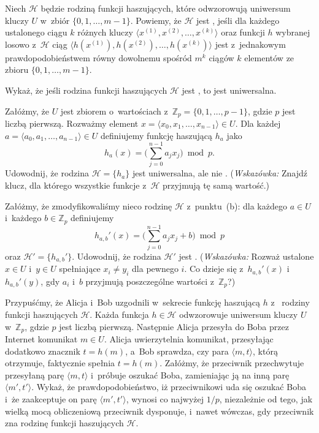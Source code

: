 \noindent Niech $\mathcal{H}$ będzie rodziną funkcji haszujących, które odwzorowują uniwersum kluczy $U$ w~zbiór $\{0,1,\dots,m-1\}$.
Powiemy, że $\mathcal{H}$ jest \textbf{}, jeśli dla każdego ustalonego ciągu $k$ różnych kluczy $\langle x^{(1)},x^{(2)},\dots,x^{(k)}\rangle$ oraz funkcji $h$ wybranej losowo z~$\mathcal{H}$ ciąg $\langle h(x^{(1)}),h(x^{(2)}),\dots,h(x^{(k)})\rangle$ jest z~jednakowym prawdopodobieństwem równy dowolnemu spośród $m^k$ ciągów $k$ elementów ze zbioru $\{0,1,\dots,m-1\}$.
\begin{description}
	\setlength{}
	\item[{\sffamily\bfseries(a)}] Wykaż, że jeśli rodzina funkcji haszujących $\mathcal{H}$ jest , to jest uniwersalna.
	\item[{\sffamily\bfseries(b)}] Załóżmy, że $U$ jest zbiorem  o~wartościach z~$\mathbb{Z}_p=\{0,1,\dots,p-1\}$, gdzie $p$ jest liczbą pierwszą.
Rozważmy element $x=\langle x_0,x_1,\dots,x_{n-1}\rangle\in U$.
Dla każdej  $a=\langle a_0,a_1,\dots,a_{n-1}\rangle\in U$ definiujemy funkcję haszującą $h_a$ jako
	\[
		h_a(x) = \biggl(\sum_{j=0}^{n-1}a_jx_j\biggr)\bmod p.
	\]
	Udowodnij, że rodzina $\mathcal{H}=\{h_a\}$ jest uniwersalna, ale nie .
(\!\emph{Wskazówka:} Znajdź klucz, dla którego wszystkie funkcje z~$\mathcal{H}$ przyjmują tę samą wartość.)
	\item[{\sffamily\bfseries(c)}] Załóżmy, że zmodyfikowaliśmy nieco rodzinę $\mathcal{H}$ z~punktu~(b): dla każdego $a\in U$ i~każdego $b\in\mathbb{Z}_p$ definiujemy
	\[
		h_{a,b}'(x) = \biggl(\sum_{j=0}^{n-1}a_jx_j+b\biggr)\bmod p
	\]
	oraz $\mathcal{H}'=\{h_{a,b}'\}$.
Udowodnij, że rodzina $\mathcal{H}'$ jest .
(\!\emph{Wskazówka:} Rozważ ustalone $x\in U$ i~$y\in U$ spełniające $x_i\ne y_i$ dla pewnego $i$.
Co dzieje się z~$h_{a,b}'(x)$ i~$h_{a,b}'(y)$, gdy $a_i$ i~$b$ przyjmują poszczególne wartości z~$\mathbb{Z}_p$?)
	\item[{\sffamily\bfseries(d)}] Przypuśćmy, że Alicja i~Bob uzgodnili w~sekrecie funkcję haszującą $h$ z~ rodziny funkcji haszujących $\mathcal{H}$.
Każda funkcja $h\in\mathcal{H}$ odwzorowuje uniwersum kluczy $U$ w~$\mathbb{Z}_p$, gdzie $p$ jest liczbą pierwszą.
Następnie Alicja przesyła do Boba przez Internet komunikat $m\in U$.
Alicja uwierzytelnia komunikat, przesyłając dodatkowo znacznik $t=h(m)$, a~Bob sprawdza, czy para $\langle m,t\rangle$, którą otrzymuje, faktycznie spełnia $t=h(m)$.
Załóżmy, że przeciwnik przechwytuje przesyłaną parę $\langle m,t\rangle$ i~próbuje oszukać Boba, zamieniając ją na inną parę $\langle m',t'\rangle$.
Wykaż, że prawdopodobieństwo, iż przeciwnikowi uda się oszukać Boba i~że zaakceptuje on parę $\langle m',t'\rangle$, wynosi co najwyżej $1/p$, niezależnie od tego, jak wielką mocą obliczeniową przeciwnik dysponuje, i~nawet wówczas, gdy przeciwnik zna rodzinę funkcji haszujących $\mathcal{H}$.
\end{description}

